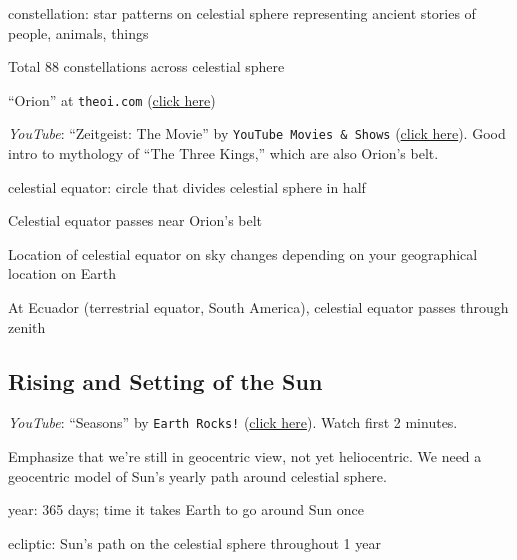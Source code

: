 \documentclass[main.tex]{subfiles}
\begin{document}
\hgraydashline

\gls{constellation}: star patterns on celestial sphere representing ancient stories of people, animals, things

Total 88 constellations across celestial sphere

 ``Orion'' at \texttt{theoi.com} (\href{https://www.theoi.com/Gigante/GiganteOrion.html}{click here})

 \textit{YouTube}: ``Zeitgeist: The Movie'' by \texttt{YouTube Movies \& Shows} (\href{https://youtu.be/xM6LXDQXMUw?t=900}{click here}). Good intro to mythology of ``The Three Kings,'' which are also Orion's belt.

\gls{celestial equator}: circle that divides celestial sphere in half

Celestial equator passes near Orion's belt

Location of celestial equator on sky changes depending on your geographical location on Earth

At Ecuador (terrestrial equator, South America), celestial equator passes through zenith

\hgraydashline

\subsection*{Rising and Setting of the Sun}

 \textit{YouTube}: ``Seasons'' by \texttt{Earth Rocks!} (\href{https://youtu.be/tX3Y5bzNDiU}{click here}). Watch first 2 minutes.

{\color{lightgray} Emphasize that we're still in geocentric view, not yet heliocentric. We need a geocentric model of Sun's yearly path around celestial sphere.}

\gls{year}: 365 days; time it takes Earth to go around Sun once

\gls{ecliptic}: Sun's path on the celestial sphere throughout 1 year
\end{document}

